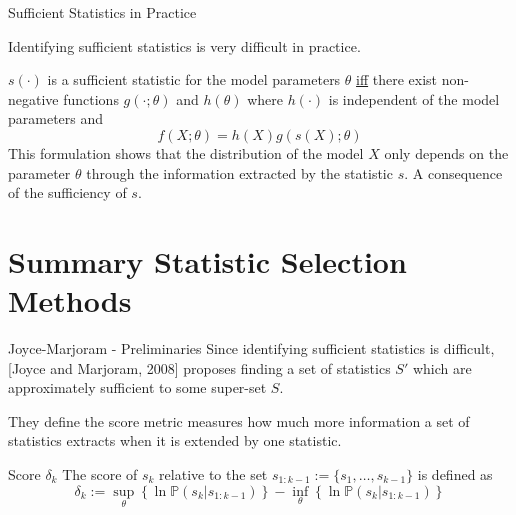 \documentclass[aspectratio=169]{beamer}
\begin{document}
\begin{frame}{Sufficient Statistics in Practice}
  \par Identifying sufficient statistics is very difficult in practice.
  \begin{theorem}
    $s(\cdot)$ is a sufficient statistic for the model parameters $\theta$ \underline{iff} there exist non-negative functions $g(\cdot;\theta)$ and $h(\theta)$ where $h(\cdot)$ is independent of the model parameters\footnotemark{} and
    \[ f(X;\theta)=h(X)g(s(X);\theta) \]
    This formulation shows that the distribution of the model $X$ only depends on the parameter $\theta$ through the information extracted by the statistic $s$. A consequence of the sufficiency of $s$.
  \end{theorem}
\end{frame}

\section{Summary Statistic Selection Methods}

\begin{frame}{Joyce-Marjoram - Preliminaries}
  Since identifying sufficient statistics is difficult, [Joyce and Marjoram, 2008] proposes finding a set of statistics $S'$ which are approximately sufficient to some super-set $S$.
  \par They define the score metric measures how much more information a set of statistics extracts when it is extended by one statistic.

  \begin{block}{Score $\delta_k$}
    The score of $s_k$ relative to the set $s_{1:k-1}:=\{s_1,\dots,s_{k-1}\}$ is defined as
    \[ \delta_k:=\sup_\theta\left\{\ln\mathbb{P}(s_k|s_{1:k-1})\right\}-\inf_\theta\left\{\ln\mathbb{P}(s_k|s_{1:k-1})\right\} \]
  \end{block}
\end{frame}
\end{document}
